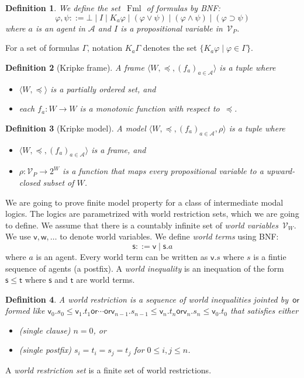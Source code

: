 \documentclass[doctor]{iscs-thesis}
\newcommand{\pvar}{\mathcal V_P}
\newcommand{\agents}{\mathcal A}
\newcommand{\wvar}{\mathcal V_W}
\newcommand{\tuple}[1]{\langle{#1}\rangle}
\newcommand{\fml}{\operatorname{Fml}}
\newtheorem{definition}{Definition}
\newcommand{\wor}{\mathsf{{or}}}
\begin{document}
\begin{definition}
We define the set~$\fml$ of formulas by BNF:
\[
 \varphi,\psi ::= \bot\mid I\mid K_a\varphi\mid (\varphi\vee\psi)\mid
 (\varphi\wedge\psi)\mid (\varphi\supset\psi)
\]
 where $a$ is an agent in $\agents$
 and $I$ is a propositional variable in~$\pvar$.
\end{definition}

For a set of formulas $\Gamma\!$, notation $K_a\Gamma$ denotes the set
$\{K_a\varphi\mid\varphi\in\Gamma\}$\enspace.

\begin{definition}[Kripke frame]
A \textit{frame} $\tuple{W,\preceq,(f_a)_{a\in \agents}}$ is a tuple where
\begin{itemize}
 \item $\tuple{W,\preceq}$ is a partially ordered set, and
 \item each $f_a\colon W\rightarrow W$ is a monotonic function with
       respect to~$\preceq$.
\end{itemize} 
\end{definition}

\begin{definition}[Kripke model]
A \textit{model} $\tuple{W,\preceq, (f_a)_{a\in \agents},\rho}$ is a tuple where
\begin{itemize}
 \item $\tuple{W,\preceq,(f_a)_{a\in \agents}}$ is a frame, and
 \item $\rho\colon \pvar\rightarrow 2^W$ is a function that maps every
       propositional variable to a upward-closed subset of $W\!$.
\end{itemize} 
\end{definition}

We are going to prove finite model property for a class of
intermediate modal logics.  The logics are parametrized with
world restriction sets,  which we are going to define.
We assume that there is a countably infinite set of \textit{world
variables}~$\wvar$.
We use $\mathsf v, \mathsf w,\ldots$ to denote world variables.
We define \textit{world terms} using BNF:
\[
 \mathsf s::=\mathsf v\mid \mathsf s.a
\]
where $a$ is an agent.
Every world term can be written as $\mathsf v.s$ where $s$ is a fintie sequence
of agents (a postfix).
A \textit{world inequality} is an inequation of the form $\mathsf s\le
\mathsf t$ where $\mathsf s$ and $\mathsf t$ are world terms.
\begin{definition}
A world restriction is a sequence of world inequalities jointed
 by~$\wor$ formed like
 $\mathsf v_0.s_0\le\mathsf v_1.t_1\wor\cdots\wor
 \mathsf v_{n-1}.s_{n-1}\le\mathsf v_n.t_n\wor \mathsf v_n.s_n\le\mathsf
 v_0.t_0$ that satisfies either
 \begin{itemize}
  \item (single clause) $n=0$, or
  \item (single postfix) $s_i = t_i = s_j = t_{j}$ for $0\le i,j\le n$.
 \end{itemize}
\end{definition}
A \textit{world restriction set} is a finite set of world restrictions.
\end{document}
